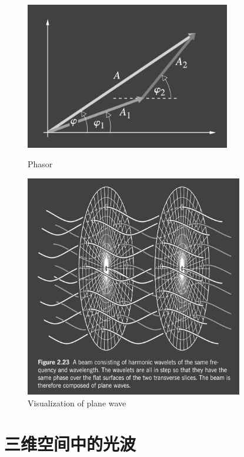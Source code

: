 \documentclass[12pt]{ctexart}%
\begin{document}
\begin{figure}[b]
    \begin{minipage}{0.6\linewidth}
        \centering
        \includegraphics[width=0.8\textwidth]{Image/1_phasor.png}
        \caption{Phasor}
        \label{phasor}
    \end{minipage}
    \begin{minipage}{0.4\linewidth}
        \centering
        \includegraphics[width=0.85\textwidth]{Image/1_plane_wave.png}
        \caption{Visualization of plane wave}
        \label{plane_wave}
    \end{minipage}
\end{figure}

\section*{三维空间中的光波}
\end{document}
